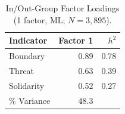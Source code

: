 \begin{table}[ht]
\centering
\caption{In/Out-Group Factor Loadings (1 factor, ML; $N = 3,895$).} 
\label{tab:fa_inout}
\begin{tabular}{lrr}
  \toprule
Indicator & Factor 1 & $h^2$ \\ 
  \midrule
Boundary & 0.89 & 0.78 \\ 
  Threat & 0.63 & 0.39 \\ 
  Solidarity & 0.52 & 0.27 \\ 
   \midrule
\% Variance & 48.3 &  \\ 
   \bottomrule
\end{tabular}
\end{table}
